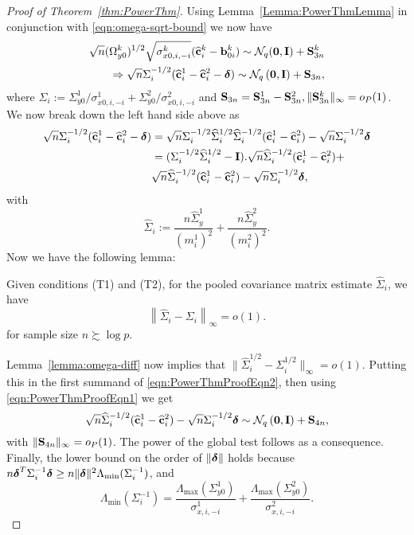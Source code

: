 \begin{proof}[Proof of Theorem~\ref{thm:PowerThm}]
Using Lemma~\ref{Lemma:PowerThmLemma} in conjunction with \eqref{eqn:omega-sqrt-bound} we now have
%
\begin{align}
\sqrt n (\Omega_{y0}^k)^{1/2} \sqrt{\sigma_{x0,i,-i}^k} (\widehat {{\bf{c}}}_i^k - {\bf{b}}_{0i}^k)  \sim
{\cal{N}}_q ( {\bf 0}, {\mathbf{I}}) + {\mathbf{S}}_{3n}^k \notag\\
\Rightarrow \sqrt n \Sigma_i^{-1/2} (\widehat {{\bf{c}}}_i^1 - \widehat {{\bf{c}}}_i^2 - {\boldsymbol{\delta}}) \sim
{\cal{N}}_q \left( {\bf 0}, {\mathbf{I}} \right) + {\mathbf{S}}_{3n},
\label{eqn:PowerThmProofEqn1}
\end{align}
%
where $\Sigma_i := \Sigma_{y0}^1/ \sigma_{x0,i,-i}^1 + \Sigma_{y0}^2/ \sigma_{x0,i,-i}^2$ and ${\mathbf{S}}_{3n} = {\mathbf{S}}_{3n}^1 - {\mathbf{S}}_{3n}^2, \|{\mathbf{S}}_{3n}^k\|_\infty = o_P(1)$. We now break down the left hand side above as
%
\begin{align}
\sqrt n \Sigma_i^{-1/2} (\widehat {{\bf{c}}}_i^1 - \widehat {{\bf{c}}}_i^2 - {\boldsymbol{\delta}}) &=
\sqrt n \Sigma_i^{-1/2} \widehat \Sigma_i^{1/2} \widehat \Sigma_i^{-1/2} (\widehat {{\bf{c}}}_i^1 - \widehat {{\bf{c}}}_i^2) - \sqrt n \Sigma_i^{-1/2} {\boldsymbol{\delta}} \notag\\
&= (\Sigma_i^{-1/2} \widehat \Sigma_i^{1/2} - {\mathbf{I}}) . \sqrt n \widehat \Sigma_i^{-1/2} (\widehat {{\bf{c}}}_i^1 - \widehat {{\bf{c}}}_i^2) + \notag\\
& \sqrt n \widehat \Sigma_i^{-1/2} (\widehat {{\bf{c}}}_i^1 - \widehat {{\bf{c}}}_i^2) - \sqrt n \Sigma_i^{-1/2} {\boldsymbol{\delta}},
\label{eqn:PowerThmProofEqn2}
\end{align}
%
with
%
$$
\widehat \Sigma_i :=
\frac{ n \widehat \Sigma_y^1}{(m_i^1)^2} + \frac{n \widehat \Sigma_y^2}{(m_i^2)^2}.
$$
%
Now we have the following lemma:
%
\begin{Lemma}\label{Lemma:PowerThmLemma2}
Given conditions (T1) and (T2), for the pooled covariance matrix estimate $\widehat \Sigma_i$, we have
%
$$
\left\| \widehat \Sigma_i - \Sigma_i \right\|_\infty = o(1).
$$
%
for sample size $n \succsim \log p$.
\end{Lemma}
%
Lemma~\ref{lemma:omega-diff} now implies that $\| \widehat \Sigma_i^{1/2} - \Sigma_i^{1/2} \|_\infty = o(1)$. Putting this in the first summand of \eqref{eqn:PowerThmProofEqn2}, then using \eqref{eqn:PowerThmProofEqn1} we get
%
$$
\sqrt n \widehat \Sigma_i^{-1/2} (\widehat {{\bf{c}}}_i^1 - \widehat {{\bf{c}}}_i^2) - \sqrt n \Sigma_i^{-1/2} {\boldsymbol{\delta}}
\sim {\cal{N}}_q \left( {\bf 0}, {\mathbf{I}} \right) + {\mathbf{S}}_{4n},
$$
%
with $\| {\mathbf{S}}_{4n} \|_\infty = o_P(1)$. The power of the global test follows as a consequence. Finally, the lower bound on the order of $\| {\boldsymbol{\delta}} \|$ holds because $n {\boldsymbol{\delta}}^T \Sigma_i^{-1} {\boldsymbol{\delta}} \geq n \| {\boldsymbol{\delta}} \|^2 \Lambda_{\min} (\Sigma_i^{-1}) $, and
%
$$
\Lambda_{\min} (\Sigma_i^{-1}) = \frac{ \Lambda_{\max} (\Sigma_{y0}^1)}{\sigma_{x,i,-i}^1} +
\frac{ \Lambda_{\max} (\Sigma_{y0}^2)}{\sigma_{x,i,-i}^2}.
$$
%
\end{proof}

